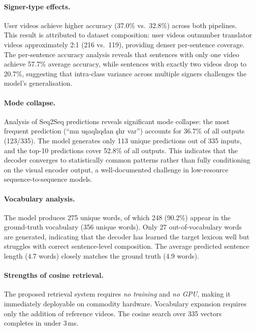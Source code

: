 \documentclass[runningheads]{llncs}
\begin{document}
\paragraph{Signer-type effects.}
User videos achieve higher accuracy (37.0\% vs.\ 32.8\%) across
both pipelines.
This result is attributed to dataset composition: user videos
outnumber translator videos approximately 2:1 (216 vs.\ 119),
providing denser per-sentence coverage.
The per-sentence accuracy analysis reveals that sentences with only
one video achieve 57.7\% average accuracy, while sentences with
exactly two videos drop to 20.7\%, suggesting that intra-class
variance across multiple signers challenges the model's
generalisation.

\paragraph{Mode collapse.}
Analysis of Seq2Seq predictions reveals significant mode collapse:
the most frequent prediction (``m\textipa{\textschwa}n
u\c{s}aql\i{}qdan \c{s}\textipa{\textschwa}h\textipa{\textschwa}r\textipa{\textschwa}
var'') accounts for 36.7\% of all outputs (123/335).
The model generates only 113 unique predictions out of 335 inputs,
and the top-10 predictions cover 52.8\% of all outputs.
This indicates that the decoder converges to statistically common
patterns rather than fully conditioning on the visual encoder output,
a well-documented challenge in low-resource sequence-to-sequence
models.

\paragraph{Vocabulary analysis.}
The model produces 275 unique words, of which 248 (90.2\%) appear in
the ground-truth vocabulary (356 unique words).
Only 27 out-of-vocabulary words are generated, indicating that the
decoder has learned the target lexicon well but struggles with
correct sentence-level composition.
The average predicted sentence length (4.7 words) closely matches
the ground truth (4.9 words).

\paragraph{Strengths of cosine retrieval.}
The proposed retrieval system requires \emph{no training} and
\emph{no GPU}, making it immediately deployable on commodity hardware.
Vocabulary expansion requires only the addition of reference videos.
The cosine search over 335 vectors completes in under 3\,ms.
\end{document}
